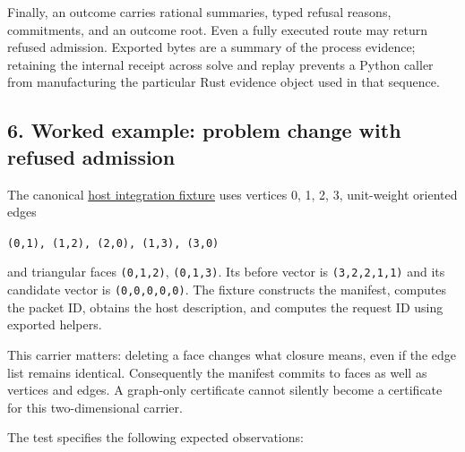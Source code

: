 \documentclass[
  11pt,
]{article}
\newcommand{\passthrough}[1]{#1}
\begin{document}
Finally, an outcome carries rational summaries, typed refusal reasons,
commitments, and an outcome root. Even a fully executed route may return
refused admission. Exported bytes are a summary of the process evidence;
retaining the internal receipt across solve and replay prevents a Python
caller from manufacturing the particular Rust evidence object used in
that sequence.

\subsection{6. Worked example: problem change with refused
admission}\label{worked-example-problem-change-with-refused-admission}

The canonical
\href{https://github.com/dbccpage/the_symbol_game/blob/52cb5457f6c485ba548cfd292f6012a941ed22cf/engine/crates_rs/core_symbol_game/tests/host_contract.rs}{host
integration fixture} uses vertices 0, 1, 2, 3, unit-weight oriented
edges

\passthrough{\lstinline!(0,1), (1,2), (2,0), (1,3), (3,0)!}

and triangular faces \passthrough{\lstinline!(0,1,2)!},
\passthrough{\lstinline!(0,1,3)!}. Its before vector is
\passthrough{\lstinline!(3,2,2,1,1)!} and its candidate vector is
\passthrough{\lstinline!(0,0,0,0,0)!}. The fixture constructs the
manifest, computes the packet ID, obtains the host description, and
computes the request ID using exported helpers.

This carrier matters: deleting a face changes what closure means, even
if the edge list remains identical. Consequently the manifest commits to
faces as well as vertices and edges. A graph-only certificate cannot
silently become a certificate for this two-dimensional carrier.

The test specifies the following expected observations:
\end{document}
